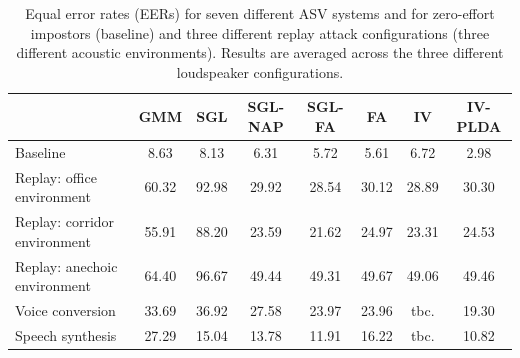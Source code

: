 \begin{table}
\renewcommand{\arraystretch}{1.2}
\begin{center}
    \begin{tabular}{ l  c c c c c c c}
    \hline
 &  GMM & SGL & SGL-NAP  & SGL-FA & FA & IV & IV-PLDA \\ 
 \hline \hline
Baseline & 8.63 & 8.13 & 6.31 & 5.72 & 5.61 & 6.72 & 2.98\\
\hline
Replay: office environment & 60.32 & 92.98 & 29.92 & 28.54 & 30.12 & 28.89 & 30.30\\
Replay: corridor environment & 55.91 & 88.20 & 23.59 & 21.62 & 24.97 & 23.31 & 24.53\\
Replay: anechoic environment & 64.40 & 96.67 & 49.44 & 49.31 & 49.67 & 49.06 & 49.46\\
\hline
Voice conversion & 33.69 & 36.92 & 27.58 & 23.97 & 23.96 & tbc. & 19.30\\
Speech synthesis & 27.29 & 15.04 & 13.78 & 11.91 & 16.22 & tbc. & 10.82\\
\hline
    \end{tabular}
    \caption{Equal error rates (EERs) for seven different ASV systems and for zero-effort impostors (baseline) and three different replay attack configurations (three different acoustic environments).  Results are averaged across the three different loudspeaker configurations.}
		\label{tab::results_EER}
   \end{center}

\end{table}


